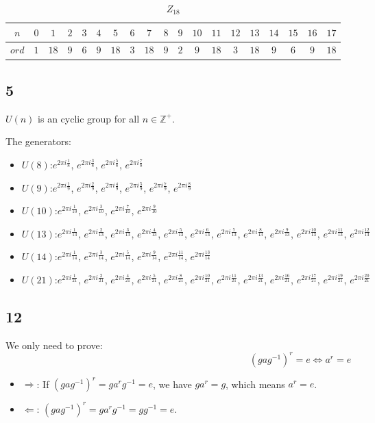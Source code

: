 \documentclass{article}
\begin{document}
			\begin{table}[!htp]
				\centering
				\caption{$Z_{18}$}
				\begin{tabular}{c|*{18}{c}}
					\toprule
					$n$ & $0$ & $1$ & $2$ & $3$ & $4$ & $5$ & $6$ & $7$ & $8$ & $9$ & $10$ & $11$ & $12$ & $13$ & $14$ & $15$ & $16$ & $17$ \\ \midrule
					$ord$ & $1$ & $18$ & $9$ & $6$ & $9$ & $18$ & $3$ & $18$ & $9$ & $2$ & $9$ & $18$ & $3$ & $18$ & $9$ & $6$ & $9$ & $18$ \\ \bottomrule
				\end{tabular}
			\end{table}

		\subsection*{5}
	
			$U(n)$ is an cyclic group for all $n \in \mathbb{Z}^{+}$.

			The generators:

			\begin{itemize}
				\item $U(8)$:$e^{2\pi i\frac{1}{8}}$, $e^{2\pi i\frac{3}{8}}$, $e^{2\pi i\frac{5}{8}}$, $e^{2\pi i\frac{7}{8}}$
				\item $U(9)$:$e^{2\pi i\frac{1}{9}}$, $e^{2\pi i\frac{2}{9}}$, $e^{2\pi i\frac{4}{9}}$, $e^{2\pi i\frac{5}{9}}$, $e^{2\pi i\frac{7}{9}}$, $e^{2\pi i\frac{8}{9}}$
				\item $U(10)$:$e^{2\pi i\frac{1}{10}}$, $e^{2\pi i\frac{3}{10}}$, $e^{2\pi i\frac{7}{10}}$, $e^{2\pi i\frac{9}{10}}$
				\item $U(13)$:$e^{2\pi i\frac{1}{13}}$, $e^{2\pi i\frac{2}{13}}$, $e^{2\pi i\frac{3}{13}}$, $e^{2\pi i\frac{4}{13}}$, $e^{2\pi i\frac{5}{13}}$, $e^{2\pi i\frac{6}{13}}$, $e^{2\pi i\frac{7}{13}}$, $e^{2\pi i\frac{8}{13}}$, $e^{2\pi i\frac{9}{13}}$, $e^{2\pi i\frac{10}{13}}$, $e^{2\pi i\frac{11}{13}}$, $e^{2\pi i\frac{12}{13}}$
				\item $U(14)$:$e^{2\pi i\frac{1}{14}}$, $e^{2\pi i\frac{3}{14}}$, $e^{2\pi i\frac{5}{14}}$, $e^{2\pi i\frac{9}{14}}$, $e^{2\pi i\frac{11}{14}}$, $e^{2\pi i\frac{13}{14}}$
				\item $U(21)$:$e^{2\pi i\frac{1}{21}}$, $e^{2\pi i\frac{2}{21}}$, $e^{2\pi i\frac{4}{21}}$, $e^{2\pi i\frac{5}{21}}$, $e^{2\pi i\frac{8}{21}}$, $e^{2\pi i\frac{10}{21}}$, $e^{2\pi i\frac{11}{21}}$, $e^{2\pi i\frac{13}{21}}$, $e^{2\pi i\frac{16}{21}}$, $e^{2\pi i\frac{17}{21}}$, $e^{2\pi i\frac{19}{21}}$, $e^{2\pi i\frac{20}{21}}$
			\end{itemize}

		\subsection*{12}
			We only need to prove: 
			$$
				(gag^{-1})^r = e \Longleftrightarrow a^r = e
			$$
			\begin{itemize}
				\item $\Rightarrow$: If $(gag^{-1})^r = ga^rg^{-1} = e$, we have $ga^r =
					g$, which means $a^r = e$.
				\item $\Leftarrow$: $(gag^{-1})^r = ga^rg^{-1} = gg^{-1} = e$.
			\end{itemize}
\end{document}
